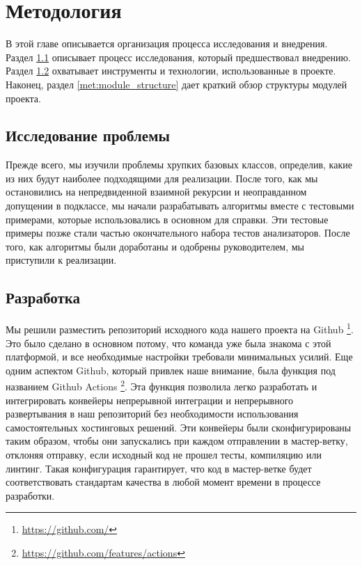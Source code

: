 \chapter{Методология}
\label{chap:met}

В этой главе описывается организация процесса исследования и внедрения. Раздел \ref{met:research} описывает процесс исследования, который предшествовал внедрению. Раздел \ref{met:development} охватывает инструменты и технологии, использованные в проекте. Наконец, раздел \ref{met:module_structure} дает краткий обзор структуры модулей проекта. 

\section{Исследование проблемы}
\label{met:research}
Прежде всего, мы изучили проблемы хрупких базовых классов, определив, какие из них будут наиболее подходящими для реализации. После того, как мы остановились на непредвиденной взаимной рекурсии и неоправданном допущении в подклассе, мы начали разрабатывать алгоритмы вместе с тестовыми примерами, которые использовались в основном для справки. Эти тестовые примеры позже стали частью окончательного набора тестов анализаторов. После того, как алгоритмы были доработаны и одобрены руководителем, мы приступили к реализации.

\section{Разработка}
\label{met:development}
Мы решили разместить репозиторий исходного кода нашего проекта на Github \footnote{\url{https://github.com/}}. Это было сделано в основном потому, что команда уже была знакома с этой платформой, и все необходимые настройки требовали минимальных усилий. Еще одним аспектом Github, который привлек наше внимание, была функция под названием Github Actions \footnote{\url{https://github.com/features/actions}}. Эта функция позволила легко разработать и интегрировать конвейеры непрерывной интеграции \cite{ci} и непрерывного развертывания \cite{cd} в наш репозиторий без необходимости использования самостоятельных хостинговых решений. Эти конвейеры были сконфигурированы таким образом, чтобы они запускались при каждом отправлении в мастер-ветку, отклоняя отправку, если исходный код не прошел тесты, компиляцию или линтинг. Такая конфигурация гарантирует, что код в мастер-ветке будет соответствовать стандартам качества в любой момент времени в процессе разработки. 

